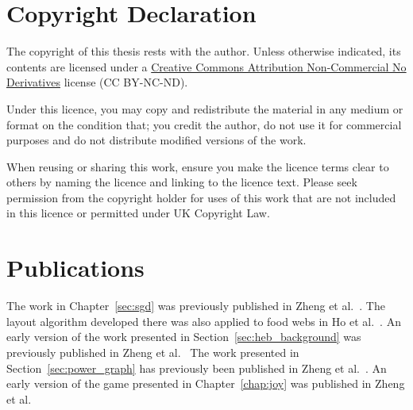 \section{Copyright Declaration}
The copyright of this thesis rests with the author. Unless otherwise indicated, its contents are licensed under a \href{http://creativecommons.org/licenses/by-nc-nd/4.0/}{Creative Commons Attribution Non-Commercial No Derivatives} license (CC BY-NC-ND).

Under this licence, you may copy and redistribute the material in any medium or format on the condition that; you credit the author, do not use it for commercial purposes and do not distribute modified versions of the work.

When reusing or sharing this work, ensure you make the licence terms clear to others by naming the licence and linking to the licence text. Please seek permission from the copyright holder for uses of this work that are not included in this licence or permitted under UK Copyright Law.

\section{Publications}

The work in Chapter~\ref{sec:sgd} was previously published in Zheng et al.\ \cite{Zheng2019Stochastic}. The layout algorithm developed there was also applied to food webs in Ho et al.\ \cite{Ho2019}.
An early version of the work presented in Section~\ref{sec:heb_background} was previously published in Zheng et al.\ \cite{Zheng2018}
The work presented in Section~\ref{sec:power_graph} has previously been published in Zheng et al.\ \cite{Zheng2019Power}.
An early version of the game presented in Chapter~\ref{chap:joy} was published in Zheng et al.\ \cite{Zheng2019Eco}
